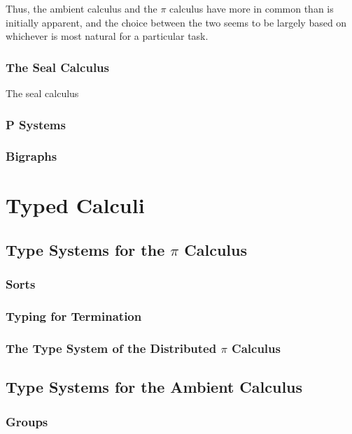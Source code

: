 Thus, the ambient calculus and the $\pi$ calculus have more in common
than is initially apparent, and the choice between the two seems to be
largely based on whichever is most natural for a particular task.

\subsubsection{The Seal Calculus}

The seal calculus \cite{seal}

\subsubsection{P Systems}
\label{psystems}

\subsubsection{Bigraphs}
\label{bigraphs}

\section{Typed Calculi}
\label{typedcalculi}

\subsection{Type Systems for the $\pi$ Calculus}

\subsubsection{Sorts}
\subsubsection{Typing for Termination}
\subsubsection{The Type System of the Distributed $\pi$ Calculus}

\subsection{Type Systems for the Ambient Calculus}
\label{ambienttypes}

\subsubsection{Groups}
\label{ambientgroups}

